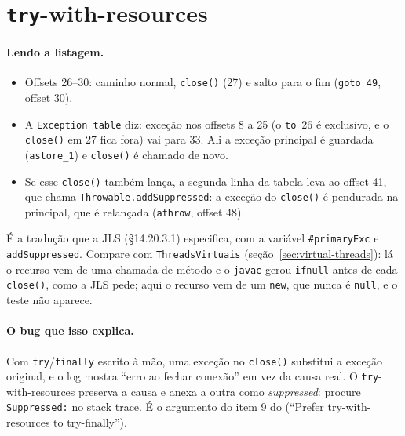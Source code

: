 \section{\texttt{try}-with-resources}
\label{sec:twr}




\paragraph{Lendo a listagem.}
\begin{itemize}
\item Offsets 26--30: caminho normal, \texttt{close()} (27) e salto para
  o fim (\texttt{goto 49}, offset 30).
\item A \texttt{Exception table} diz: exceção nos offsets 8 a 25 (o
  \texttt{to}~26 é exclusivo, e o \texttt{close()} em 27 fica fora) vai
  para 33. Ali a exceção principal é guardada (\texttt{astore\_1}) e
  \texttt{close()} é chamado de novo.
\item Se esse \texttt{close()} também lança, a segunda linha da tabela
  leva ao offset 41, que chama
  \texttt{Throwable.addSuppressed}: a exceção do \texttt{close()} é
  pendurada na principal, que é relançada (\texttt{athrow}, offset 48).
\end{itemize}

É a tradução que a JLS (§14.20.3.1) especifica, com a variável
\texttt{\#primaryExc} e \texttt{addSuppressed}. Compare com
\texttt{ThreadsVirtuais} (seção~\ref{sec:virtual-threads}): lá o recurso
vem de uma chamada de método e o \texttt{javac} gerou \texttt{ifnull}
antes de cada \texttt{close()}, como a JLS pede; aqui o recurso vem de
um \texttt{new}, que nunca é \texttt{null}, e o teste não aparece.

\paragraph{O bug que isso explica.}
Com \texttt{try}/\texttt{finally} escrito à mão, uma exceção no
\texttt{close()} substitui a exceção original, e o log mostra
\enquote{erro ao fechar conexão} em vez da causa real. O
\texttt{try}-with-resources preserva a causa e anexa a outra como
\emph{suppressed}: procure \texttt{Suppressed:} no stack trace. É o
argumento do item 9 do  (\enquote{Prefer
try-with-resources to try-finally}).
